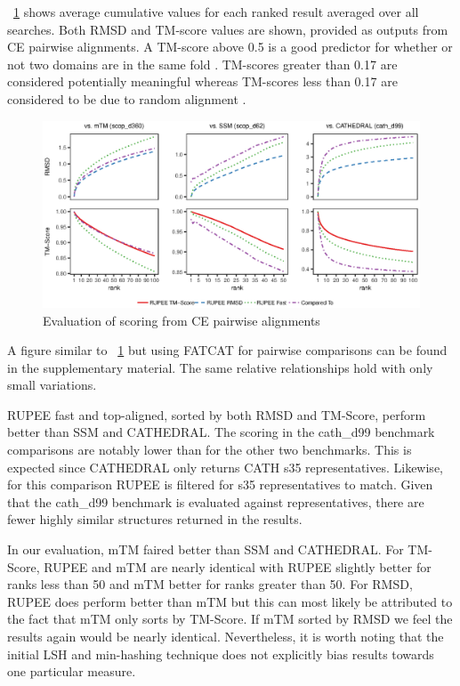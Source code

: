 \documentclass[a4,center,fleqn]{NAR}
\begin{document}
\figurename~\ref{fig:combined_scoring_ce} shows average cumulative values for each ranked result averaged over all searches.
Both RMSD and TM-score values are shown, provided as outputs from CE pairwise alignments. 
A TM-score above 0.5 is a good predictor for whether or not two domains are in the same fold \cite{Xu2010}.
TM-scores greater than 0.17 are considered potentially meaningful whereas TM-scores less than 0.17 are considered to be due to random alignment \cite{Zhang2004}.

\begin{figure}[tb]
\begin{center}
\includegraphics{combined_scoring_ce}
\end{center}
\caption{Evaluation of scoring from CE pairwise alignments}
\label{fig:combined_scoring_ce}
\end{figure}

A figure similar to \figurename~\ref{fig:combined_scoring_ce} but using FATCAT for pairwise comparisons can be found in the supplementary material. 
The same relative relationships hold with only small variations. 

RUPEE fast and top-aligned, sorted by both RMSD and TM-Score, perform better than SSM and CATHEDRAL.
The scoring in the cath\_d99 benchmark comparisons are notably lower than for the other two benchmarks. 
This is expected since CATHEDRAL only returns CATH s35 representatives.
Likewise, for this comparison RUPEE is filtered for s35 representatives to match. 
Given that the cath\_d99 benchmark is evaluated against representatives, there are fewer highly similar structures returned in the results. 

In our evaluation, mTM faired better than SSM and CATHEDRAL. 
For TM-Score, RUPEE and mTM are nearly identical with RUPEE slightly better for ranks less than 50 and mTM better for ranks greater than 50. 
For RMSD, RUPEE does perform better than mTM but this can most likely be attributed to the fact that mTM only sorts by TM-Score. 
If mTM sorted by RMSD we feel the results again would be nearly identical.
Nevertheless, it is worth noting that the initial LSH and min-hashing technique does not explicitly bias results towards one particular measure. 
\end{document}
